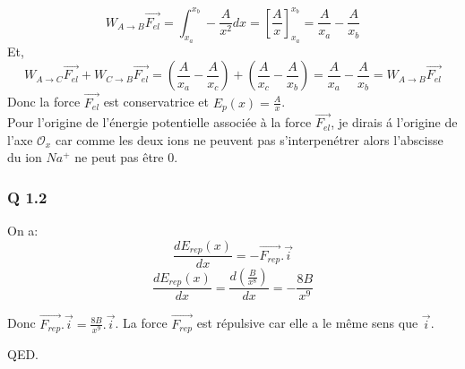\documentclass[]{book}
\theoremstyle{definition}
\begin{document}
$$W_{A \to B} \overrightarrow{F_{el}} = \int_{x_a}^{x_b} -\frac{A}{x^2}dx = \left[ \frac{A}{x} \right]_{x_a}^{x_b} = \frac{A}{x_a} -\frac{A}{x_b}$$
Et,
$$W_{A \to C} \overrightarrow{F_{el}} + W_{C \to B} \overrightarrow{F_{el}} = (\frac{A}{x_a} -\frac{A}{x_c}) + (\frac{A}{x_c} -\frac{A}{x_b}) = \frac{A}{x_a} -\frac{A}{x_b} = W_{A \to B} \overrightarrow{F_{el}}$$
Donc la force $\overrightarrow{F_{el}}$ est conservatrice et $E_p(x) = \frac{A}{x}$.\\

Pour l'origine de l'\'energie potentielle associ\'ee \`a la force $\overrightarrow{F_{el}}$, je dirais \'a l'origine de l'axe $\mathcal{O}_x$  car comme les deux ions ne peuvent pas s'interpen\'etrer alors l'abscisse du ion $Na^{+}$ ne peut pas \^etre $0$.


\subsubsection*{Q 1.2}
On a: $$\frac{dE_{rep}(x)}{dx} = -\overrightarrow{F_{rep}}.\overrightarrow{i}$$
$$\frac{dE_{rep}(x)}{dx} = \frac{d(\frac{B}{x^8})}{dx} = -\frac{8B}{x^9}$$

Donc $\overrightarrow{F_{rep}}.\overrightarrow{i} = \frac{8B}{x^9}.\overrightarrow{i}$. La force $\overrightarrow{F_{rep}}$ est r\'epulsive car elle a le m\^eme sens que $\overrightarrow{i}$.


QED.
\end{document}
